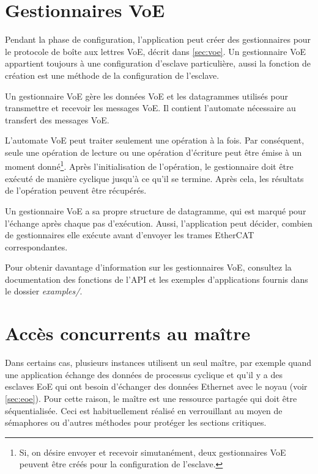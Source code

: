 \documentclass[a4paper,12pt,BCOR=6mm,bibtotoc,idxtotoc]{scrbook}
\begin{document}
%


\section{Gestionnaires VoE}
\label{sec:api-voe}

Pendant la phase de configuration, l'application peut cr\'eer des
gestionnaires pour le protocole de bo\^ite aux lettres VoE, d\'ecrit
dans \autoref{sec:voe}. Un gestionnaire VoE appartient toujours \`a
une configuration d'esclave particuli\`ere, aussi la fonction de
cr\'eation est une m\'ethode de la configuration de l'esclave.

Un gestionnaire VoE g\`ere les donn\'ees VoE et les datagrammes
utilis\'es pour transmettre et recevoir les messages VoE. Il contient
l'automate n\'ecessaire au transfert des messages VoE.

L'automate VoE peut traiter seulement une op\'eration \`a la fois. Par
cons\'equent, seule une op\'eration de lecture ou une op\'eration
d'\'ecriture peut \^etre \'emise \`a un moment donn\'e\footnote{Si, on
d\'esire envoyer et recevoir simutan\'ement, deux gestionnaires VoE
peuvent \^etre cr\'e\'es pour la configuration de l'esclave.}. Apr\`es
l'initialisation de l'op\'eration, le gestionnaire doit \^etre
ex\'ecut\'e de mani\`ere cyclique jusqu'\`a ce qu'il se termine.
Apr\`es cela, les r\'esultats de l'op\'eration peuvent \^etre
r\'ecup\'er\'es.

Un gestionnaire VoE a sa propre structure de datagramme, qui est
marqu\'e pour l'\'echange apr\`es chaque pas d'ex\'ecution. Aussi,
l'application peut d\'ecider, combien de gestionnaires elle ex\'ecute
avant d'envoyer les trames EtherCAT correspondantes.

Pour obtenir davantage d'information sur les gestionnaires VoE,
consultez la documentation des fonctions de l'API et les exemples
d'applications fournis dans le dossier \textit{examples/}.


\section{Acc\`es concurrents au ma\^itre}
\label{sec:concurr}

Dans certains cas,  plusieurs instances utilisent un seul ma\^itre,
par exemple quand une application \'echange des donn\'ees de processus
cyclique et qu'il y a des esclaves EoE qui ont besoin d'\'echanger des
donn\'ees Ethernet avec le noyau (voir \autoref{sec:eoe}). Pour
cette raison, le ma\^itre est une ressource partag\'ee qui doit \^etre
s\'equentialis\'ee. Ceci est habituellement r\'ealis\'e en
verrouillant au moyen de s\'emaphores ou d'autres m\'ethodes pour
prot\'eger les sections critiques.
\end{document}
